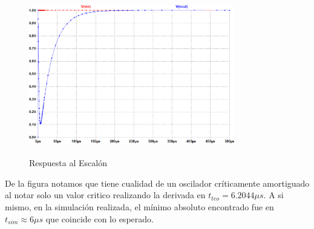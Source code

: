 \begin{figure}[h]
	\centering
	\includegraphics[width=0.8\textwidth, height = 7cm]{../EJ1/RElaqueva.png}
	\caption{Respuesta al Escalón}
	\label{ej1_3}
\end{figure}

De la figura notamos que tiene cualidad de un oscilador críticamente amortiguado al notar solo un valor critico realizando la derivada en $t_{teo} = 6.2044\mu s$. A si mismo, en la simulación realizada, el mínimo absoluto encontrado fue en $t_{sim} \approx 6 \mu s$ que coincide con lo esperado. 
